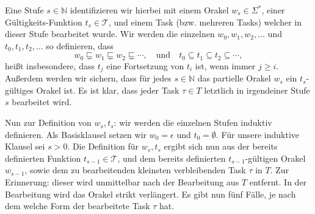 Eine Stufe $s\in\mathbb N$ identifizieren wir hierbei mit einem Orakel $w_s\in\Sigma^*$, einer Gültigkeits-Funktion $t_s\in\mathcal T$, und einem Task (bzw. mehreren Tasks) welcher in dieser Stufe bearbeitet wurde.
Wir werden die einzelnen $w_0, w_1, w_2, \dots$ und $t_0, t_1, t_2, \dots$ so definieren, dass
\[ w_0\sqsubsetneq w_1 \sqsubsetneq w_2 \sqsubsetneq \cdots, \quad\text{und}\quad t_0 \subseteq t_1 \subseteq t_2 \subseteq \cdots, \]
heißt insbesondere, dass $t_j$ eine Fortsetzung von $t_i$ ist, wenn immer $j\geq i$.
Außerdem werden wir sichern, dass für jedes $s\in\mathbb N$ das partielle Orakel $w_s$ ein $t_s$-gültiges Orakel ist.
Es ist klar, dass jeder Task $\tau\in T$ letztlich in irgendeiner Stufe $s$ bearbeitet wird.


Nun zur Definition von $w_s, t_s$: wir werden die einzelnen Stufen induktiv definieren. Als Basisklausel setzen wir $w_0 = \epsilon$ und $t_0 = \emptyset$.
Für unsere induktive Klausel sei $s>0$. Die Definition für $w_s, t_s$ ergibt sich nun aus der bereits definierten Funktion $t_{s-1}\in\mathcal T$, und dem bereits definierten $t_{s-1}$-gültigen Orakel $w_{s-1}$, sowie dem zu bearbeitenden kleinsten verbleibenden Task $\tau$ in $T$.
Zur Erinnerung: dieser wird unmittelbar nach der Bearbeitung aus $T$ entfernt. In der Bearbeitung wird das Orakel strikt verlängert.
Es gibt nun fünf Fälle, je nach dem welche Form der bearbeitete Task $\tau$ hat.
